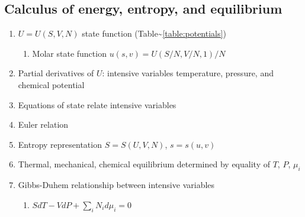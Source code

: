 \documentclass[11pt]{article}
\begin{document}
\subsection{Calculus of energy, entropy, and equilibrium}
\label{sec:org6240f54}
\begin{enumerate}
\item \(U = U(S,V,N)\) state function (Table\textasciitilde{}\ref{table:potentials})
\begin{enumerate}
\item Molar state function \(u(s,v)= U(S/N,V/N,1)/N\)
\end{enumerate}
\item Partial derivatives of \(U\): intensive variables temperature, pressure, and chemical potential
\item Equations of state relate intensive variables
\item Euler relation
\item Entropy representation \(S = S(U,V,N)\), \(s=s(u,v)\)
\item Thermal, mechanical, chemical equilibrium determined by equality of \(T\), \(P\), \(\mu_i\)
\item Gibbs-Duhem relationship between intensive variables
\begin{enumerate}
\item \(SdT -VdP+\sum_i N_id\mu_i=0\)
\end{enumerate}
\end{enumerate}
\end{document}
